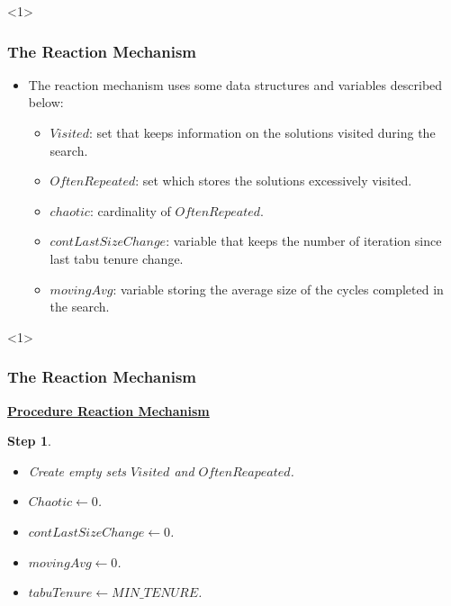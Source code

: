\documentclass{beamer}
\newtheorem{step}{Step}
\begin{document}
\begin{frame}<1>
  \frametitle{The Reaction Mechanism}

{ 

  \begin{itemize}
  	
  	\item The reaction mechanism uses some data structures and variables described below:
  		\begin{itemize}
  			\item $Visited$: set that keeps information on the solutions visited during the search.
  			\item $OftenRepeated$: set which stores the solutions excessively visited.
  			\item $chaotic$: cardinality of $OftenRepeated$.
  			\item $contLastSizeChange$: variable  that keeps the number of iteration since last tabu tenure change.
  			\item $movingAvg$: variable storing the average size of the cycles completed in the search.
  		\end{itemize}

  	
  \end{itemize}

}
\end{frame}

\begin{frame}<1>
  \frametitle{The Reaction Mechanism}

{ \footnotesize

\begin{block}

\underline{\bf Procedure Reaction Mechanism}

\begin{step} 

\begin{itemize}
    \item[-] Create empty sets $Visited$ and $OftenReapeated$.
    \item[-] $Chaotic \leftarrow 0$.
    \item[-] $contLastSizeChange \leftarrow 0$.
    \item[-] $movingAvg\leftarrow 0$.
    \item[-] $tabuTenure \leftarrow MIN\_TENURE$.
\end{itemize}

\end{step}

\end{block}

}

\end{frame}
\end{document}
